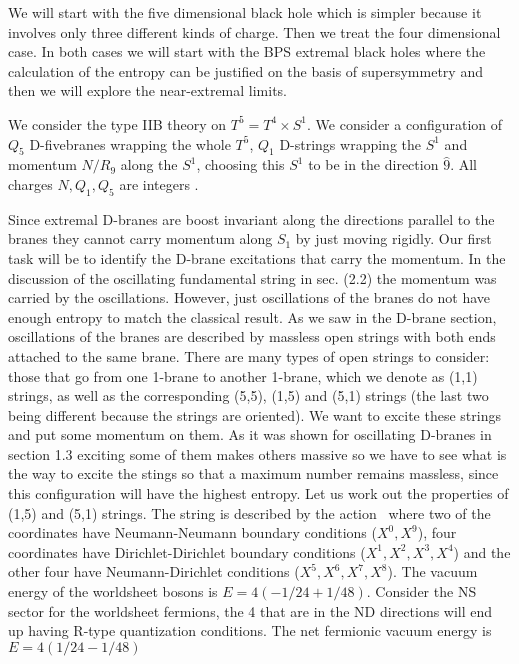   
We will start with the five dimensional black hole which
is  simpler because it   involves  only three
different kinds of charge. Then we treat  the
four dimensional case. In both cases
we will start with the BPS extremal black holes 
where the  calculation of the entropy 
 can be justified on the
basis of supersymmetry and then we will 
explore the near-extremal limits. 



We consider the type IIB theory on $T^5 = T^4\times S^1$.
We consider a configuration of
$Q_5$ D-fivebranes wrapping the whole $T^5$,
$Q_1$ D-strings wrapping the $S^1$ and momentum $N/R_9$ 
along the $S^1$, choosing this $S^1$ to be in the
direction $\hat9$. All charges $N,Q_1,Q_5$ are integers \einstein . 

Since extremal D-branes are boost invariant along the
directions parallel to the branes they cannot carry
momentum along $S_1$ by just moving rigidly.
Our first task will be to identify the D-brane excitations
that carry the momentum. 
In the discussion of the oscillating fundamental string in 
sec. (2.2) the 
momentum was carried by the oscillations.
However, just oscillations of the branes do not have
enough entropy to match the classical result.
As we saw in the D-brane section, oscillations of the 
branes are described by massless open strings with both ends 
attached to 
the same  brane.
There are many types of open strings to consider: those that
go from one 1-brane to another 1-brane, which  we denote  as (1,1) strings,
as well as the corresponding  (5,5), (1,5) and (5,1) strings (the last two
being different because the strings are oriented). 
We want to excite these strings and put some momentum on them.
As it was shown for  oscillating D-branes in 
section 1.3  exciting some of them makes others massive so we
have to see what is the way to excite the stings so that
a maximum number remains massless, since  this  configuration will
 have the 
highest entropy. 
Let us work out the properties of (1,5) and (5,1) strings.
The string is described by the action \actionstr\ where 
two of the coordinates have Neumann-Neumann boundary conditions 
($X^0,X^9$), four coordinates have Dirichlet-Dirichlet boundary
conditions ($X^1,X^2,X^3,X^4$) and the other four have
Neumann-Dirichlet conditions ($X^5,X^6,X^7,X^8$).
The vacuum energy of the worldsheet bosons is 
$ E = 4(-1/24 + 1/48)$. Consider the NS sector for the
worldsheet fermions, 
the  4 that
are in the ND directions will end up having R-type quantization
conditions. The net fermionic vacuum energy is $ E= 4( 1/24 -  1/48) $
